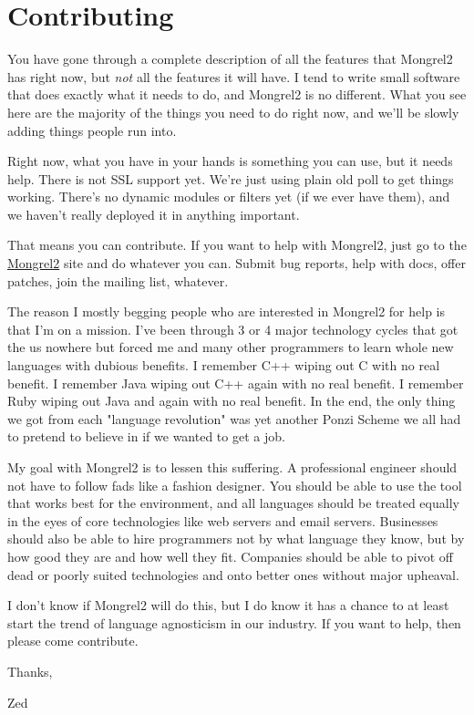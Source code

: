 \chapter{Contributing}

You have gone through a complete description of all the features that Mongrel2 has right now,
but \emph{not} all the features it will have.  I tend to write small software that does 
exactly what it needs to do, and Mongrel2 is no different.  What you see here are the 
majority of the things you need to do right now, and we'll be slowly adding things 
people run into.

Right now, what you have in your hands is something you can use, but it needs help.
There is not SSL support yet.  We're just using plain old poll to get things working.
There's no dynamic modules or filters yet (if we ever have them), and we haven't
really deployed it in anything important.

That means you can contribute.  If you want to help with Mongrel2, just go to 
the \href{http://mongrel2.org}{Mongrel2} site and do whatever you can.  Submit bug
reports, help with docs, offer patches, join the mailing list, whatever.

The reason I mostly begging people who are interested in Mongrel2 for help is that I'm
on a mission.  I've been through 3 or 4 major technology cycles that got the us nowhere
but forced me and many other programmers to learn whole new languages with dubious 
benefits.  I remember C++ wiping out C with no real benefit.  I remember Java wiping 
out C++ again with no real benefit.  I remember Ruby wiping out Java and again with no
real benefit.  In the end, the only thing we got from each "language revolution" was
yet another Ponzi Scheme we all had to pretend to believe in if we wanted to get a
job.

My goal with Mongrel2 is to lessen this suffering.  A professional engineer should not
have to follow fads like a fashion designer.  You should be able to use the tool that
works best for the environment, and all languages should be treated equally in the eyes
of core technologies like web servers and email servers.  Businesses should also be
able to hire programmers not by what language they know, but by how good they are and
how well they fit.  Companies should be able to pivot off dead or poorly suited
technologies and onto better ones without major upheaval.

I don't know if Mongrel2 will do this, but I do know it has a chance to at least start
the trend of language agnosticism in our industry.  If you want to help, then please
come contribute.

Thanks,

\indent Zed
